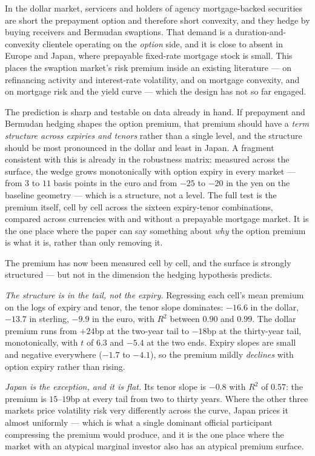 \documentclass[11pt]{article}
\begin{document}
In the dollar market, servicers and holders of agency mortgage-backed securities are short the
prepayment option and therefore short convexity, and they hedge by buying receivers and Bermudan
swaptions. That demand is a duration-and-convexity clientele operating on the \emph{option} side, and it
is close to absent in Europe and Japan, where prepayable fixed-rate mortgage stock is small. This places
the swaption market's risk premium inside an existing literature --- \citet{duarte2008} on refinancing
activity and interest-rate volatility, \citet{perlisack2003} and \citet{hanson2014} on mortgage
convexity, and \citet{mmvv2016} on mortgage risk and the yield curve --- which the design has not so far
engaged.

The prediction is sharp and testable on data already in hand. If prepayment and Bermudan hedging shapes
the option premium, that premium should have a \emph{term structure across expiries and tenors} rather
than a single level, and the structure should be most pronounced in the dollar and least in Japan. A
fragment consistent with this is already in the robustness matrix: measured across the surface, the
wedge grows monotonically with option expiry in every market --- from $3$ to $11$ basis points in the
euro and from $-25$ to $-20$ in the yen on the baseline geometry --- which is a structure, not a level.
The full test is the premium itself, cell by cell across the sixteen expiry-tenor combinations, compared
across currencies with and without a prepayable mortgage market. It is the one place where the paper can
say something about \emph{why} the option premium is what it is, rather than only removing it.

The premium has now been measured cell by cell, and the surface is strongly structured --- but not in
the dimension the hedging hypothesis predicts.

\emph{The structure is in the tail, not the expiry.} Regressing each cell's mean premium on the logs of
expiry and tenor, the tenor slope dominates: $-16.6$ in the dollar, $-13.7$ in sterling, $-9.9$ in the
euro, with $R^2$ between $0.90$ and $0.99$. The dollar premium runs from $+24$bp at the two-year tail to
$-18$bp at the thirty-year tail, monotonically, with $t$ of $6.3$ and $-5.4$ at the two ends. Expiry
slopes are small and negative everywhere ($-1.7$ to $-4.1$), so the premium mildly \emph{declines} with
option expiry rather than rising.

\emph{Japan is the exception, and it is flat.} Its tenor slope is $-0.8$ with $R^2$ of $0.57$: the
premium is $15$--$19$bp at every tail from two to thirty years. Where the other three markets price
volatility risk very differently across the curve, Japan prices it almost uniformly --- which is what a
single dominant official participant compressing the premium would produce, and it is the one place where
the market with an atypical marginal investor also has an atypical premium surface.
\end{document}
